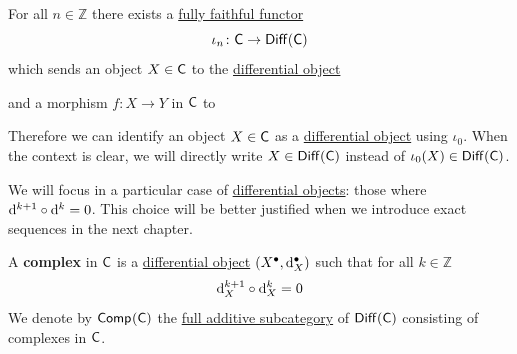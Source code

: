 \documentclass[../../main]{subfiles}
\begin{document}
\begin{remark}\label{rem:identification-diff}
  For all \(n \in \mathbb{Z}\) there exists a \hyperref[def:functor-types]{fully faithful functor}
  \begin{equation*}
    \iota_{n}\colon \mathsf{C} \to \mathsf{Diff}(\mathsf{C})
  \end{equation*}
  which sends an object \(X \in \mathsf{C}\) to the \hyperref[def:differential-object-additive]{differential object}
  \begin{center}
  \end{center}
  and a morphism \(f\colon X \to Y\) in \(\mathsf{C}\) to
  \begin{center}
  \end{center}
  Therefore we can identify an object \(X \in \mathsf{C}\) as a \hyperref[def:differential-object-additive]{differential object} using \(\iota_{0}\).
  When the context is clear, we will directly write \(X \in \mathsf{Diff}(\mathsf{C})\) instead of \(\iota_{0}(X) \in \mathsf{Diff}(\mathsf{C})\).
\end{remark}

We will focus in a particular case of \hyperref[def:differential-object-additive]{differential objects}: those where \(\mathrm{d}^{k+1} \circ \mathrm{d}^{k} = 0\).
This choice will be better justified when we introduce exact sequences in the next chapter.

\begin{definition}[Complex]\label{def:complex}
  A \textbf{complex} in \(\mathsf{C}\) is a \hyperref[def:differential-object-additive]{differential object} \((X^{\bullet}, \mathrm{d}_{X}^{\bullet})\) such that for all \(k \in \mathbb{Z}\)
  \begin{equation*}
    \mathrm{d}_{X}^{k+1} \circ \mathrm{d}_{X}^{k} = 0
  \end{equation*}
  We denote by \(\mathsf{Comp}^{}(\mathsf{C})\) the \hyperref[def:full-additive-subcategory]{full additive subcategory} of \(\mathsf{Diff}(\mathsf{C})\) consisting of complexes in \(\mathsf{C}\).
\end{definition}
\end{document}
